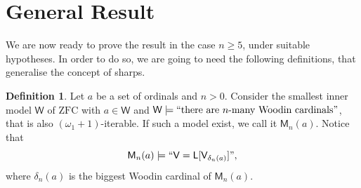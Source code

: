 \documentclass[10pt]{amsart}
\renewcommand\le\leqslant
\renewcommand\ge\geqslant
\theoremstyle{definition}
\newtheorem{definition}[theorem]{Definition}
\begin{document}




\section{General Result}\label{main}

We are now ready to prove the result in the case $n\ge5$, under suitable hypotheses. In order to do so, we are going to need the following definitions, that generalise the concept of sharps.

\begin{definition}
    Let $a$ be a set of ordinals and $n>0$. Consider the smallest inner model $\mathsf W$ of $\mathrm{ZFC}$ with $a\in\mathsf W$ and $\mathsf W\models``\text{there are } n\text{-many Woodin cardinals}"$, that is also $(\omega_1+1)$-iterable. If such a model exist, we call it $\mathsf M_n(a)$. Notice that \[\mathsf M_n(a)\models ``\mathsf V=\mathsf L[\mathsf V_{\delta_n(a)}]",\] where $\delta_n(a)$ is the biggest Woodin cardinal of $\mathsf M_n(a)$.
\end{definition}
\end{document}
